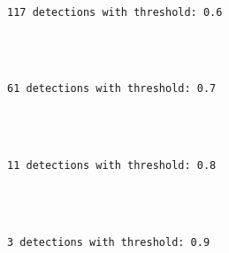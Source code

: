 \documentclass[11pt]{article}
\begin{document}
    \begin{center}
    \end{center}
    { \hspace*{\fill} \\}
    
    \begin{Verbatim}[commandchars=\\\{\}]
117 detections with threshold: 0.6


    \end{Verbatim}

    \begin{center}
    \end{center}
    { \hspace*{\fill} \\}
    
    \begin{Verbatim}[commandchars=\\\{\}]
61 detections with threshold: 0.7


    \end{Verbatim}

    \begin{center}
    \end{center}
    { \hspace*{\fill} \\}
    
    \begin{Verbatim}[commandchars=\\\{\}]
11 detections with threshold: 0.8


    \end{Verbatim}

    \begin{center}
    \end{center}
    { \hspace*{\fill} \\}
    
    \begin{Verbatim}[commandchars=\\\{\}]
3 detections with threshold: 0.9


    \end{Verbatim}

    \begin{center}
    \end{center}
    { \hspace*{\fill} \\}
    
\end{document}
